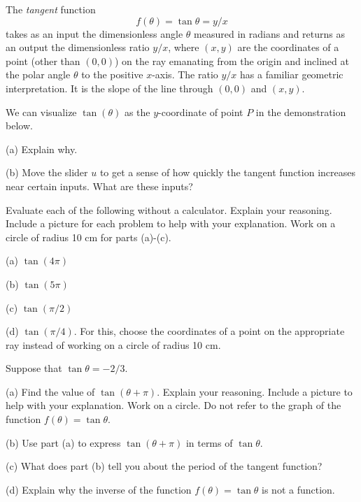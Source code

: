 \documentclass{ximera}
\begin{document}
The \emph{tangent} function 
\[
   f(\theta) = \tan \theta = y/x
\]
takes as an input the dimensionless angle $\theta$ measured in radians and returns as an output the dimensionless ratio $y/x$, where $(x,y)$ are the coordinates of a point (other than $(0,0)$) on the ray emanating from the origin and inclined at the polar angle $\theta$ to the positive $x$-axis. The ratio $y/x$ has a familiar geometric interpretation. It is the slope of the line through $(0,0)$ and $(x,y)$. 

\begin{exploration}\label{Exp3:Comp}
We can visualize $\tan(\theta)$ as the $y$-coordinate of point $P$ in the demonstration below. 
\begin{question} \label{Qetgfgyyy5} 
(a) Explain why.

(b) Move the slider $u$ to get a sense of how quickly the tangent function increases near certain inputs. What are these inputs?
\end{question}


 
\begin{onlineOnly}
    \begin{center}
\end{center}
\end{onlineOnly}
\end{exploration}



\begin{question}   \label{Q9:InverseTrig}
Evaluate each of the following without a calculator. Explain your reasoning. Include a picture for each problem to help with your explanation. Work on a circle of radius 10 cm for parts (a)-(c).

(a) $\tan (4\pi)$

(b) $\tan (5\pi)$

(c) $\tan (\pi/2)$

(d) $\tan (\pi/4)$. For this, choose the coordinates of a point on the appropriate ray instead of working on a circle of radius 10 cm.

\end{question}


\begin{question}   \label{Q11:InverseTrig}
Suppose that $\tan\theta = -2/3$.

(a) Find the value of $\tan (\theta + \pi)$. Explain your reasoning. Include a picture to help with your explanation. Work on a circle. Do not refer to the graph of the function $f(\theta) = \tan\theta$.

(b) Use part (a) to express $\tan(\theta + \pi)$ in terms of $\tan\theta$. 

(c) What does part (b) tell you about the period of the tangent function?

(d) Explain why the inverse of the function $f(\theta) = \tan\theta$ is not a function.

\end{question}
\end{document}
